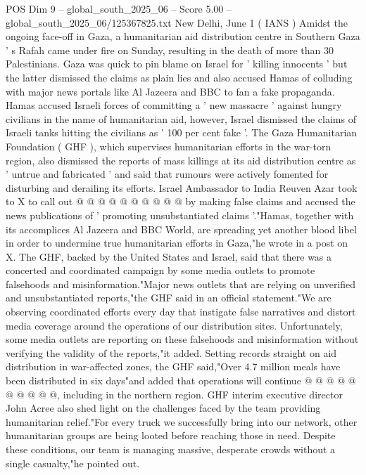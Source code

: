 \begin{textsample}{POS Dim 9 – global\_south\_2025\_06 – Score 5.00 – global\_south\_2025\_06/125367825.txt}  \label{ex:f9_pos_174}
New Delhi, June 1 ( IANS ) Amidst the ongoing face-off in Gaza, a humanitarian aid distribution centre in Southern Gaza ' s Rafah came under fire on Sunday, resulting in the death of more than 30 Palestinians.
Gaza was quick to pin blame on Israel for ' killing innocents ' but the latter dismissed the claims as plain lies and also accused Hamas of colluding with major news portals like Al Jazeera and BBC to fan a fake propaganda.
Hamas accused Israeli forces of committing a ' new massacre ' against hungry civilians in the name of humanitarian aid, however, Israel dismissed the claims of Israeli tanks hitting the civilians as ' 100 per cent fake '.
The Gaza Humanitarian Foundation ( GHF ), which supervises humanitarian efforts in the war-torn region, also dismissed the reports of mass killings at its aid distribution centre as ' untrue and fabricated ' and said that rumours were actively fomented for disturbing and derailing its efforts.
Israel Ambassador to India Reuven Azar took to X to call out @ @ @ @ @ @ @ @ @ @ by making false claims and accused the news publications of ' promoting unsubstantiated claims '."Hamas, together with its accomplices Al Jazeera and BBC World, are spreading yet another blood libel in order to undermine true humanitarian efforts in Gaza,"he wrote in a post on X.
The GHF, backed by the United States and Israel, said that there was a concerted and coordinated campaign by some media outlets to promote falsehoods and misinformation."Major news outlets that are relying on unverified and unsubstantiated reports,"the GHF said in an official statement."We are observing coordinated efforts every day that instigate false narratives and distort media coverage around the operations of our distribution sites.
Unfortunately, some media outlets are reporting on these falsehoods and misinformation without verifying the validity of the reports,"it added.
Setting records straight on aid distribution in war-affected zones, the GHF said,"Over 4.7 million meals have been distributed in six days"and added that operations will continue @ @ @ @ @ @ @ @ @ @, including in the northern region.
GHF interim executive director John Acree also shed light on the challenges faced by the team providing humanitarian relief."For every truck we successfully bring into our network, other humanitarian groups are being looted before reaching those in need.
Despite these conditions, our team is managing massive, desperate crowds without a single casualty,"he pointed out.

\end{textsample}
